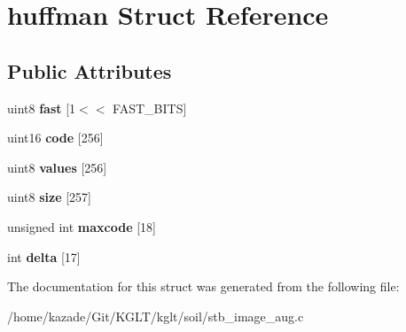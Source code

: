 \hypertarget{structhuffman}{\section{huffman Struct Reference}
\label{structhuffman}
}
\subsection*{Public Attributes}
\begin{DoxyCompactItemize}
\item 
\hypertarget{structhuffman_a9dbb29a8ed724a32f502d9595510ddc2}{uint8 {\bfseries fast} \mbox{[}1$<$$<$ F\-A\-S\-T\-\_\-\-B\-I\-T\-S\mbox{]}}\label{structhuffman_a9dbb29a8ed724a32f502d9595510ddc2}

\item 
\hypertarget{structhuffman_a9925018a95d5a2122cd732561fa0fa64}{uint16 {\bfseries code} \mbox{[}256\mbox{]}}\label{structhuffman_a9925018a95d5a2122cd732561fa0fa64}

\item 
\hypertarget{structhuffman_a313d78cf23f40b314c25681ff2a6224b}{uint8 {\bfseries values} \mbox{[}256\mbox{]}}\label{structhuffman_a313d78cf23f40b314c25681ff2a6224b}

\item 
\hypertarget{structhuffman_afdb0fbcf25aec42ba30b0d0e2453a057}{uint8 {\bfseries size} \mbox{[}257\mbox{]}}\label{structhuffman_afdb0fbcf25aec42ba30b0d0e2453a057}

\item 
\hypertarget{structhuffman_aeb78aca6c7377faaad8123566d54fc98}{unsigned int {\bfseries maxcode} \mbox{[}18\mbox{]}}\label{structhuffman_aeb78aca6c7377faaad8123566d54fc98}

\item 
\hypertarget{structhuffman_a04255e3e1c6de74d36a08a1aa4e9537d}{int {\bfseries delta} \mbox{[}17\mbox{]}}\label{structhuffman_a04255e3e1c6de74d36a08a1aa4e9537d}

\end{DoxyCompactItemize}


The documentation for this struct was generated from the following file\-:\begin{DoxyCompactItemize}
\item 
/home/kazade/\-Git/\-K\-G\-L\-T/kglt/soil/stb\-\_\-image\-\_\-aug.\-c\end{DoxyCompactItemize}
